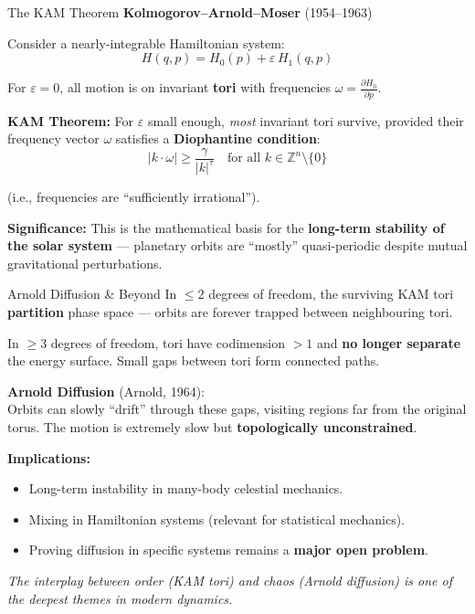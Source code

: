\begin{frame}{The KAM Theorem}
\textbf{Kolmogorov--Arnold--Moser} (1954--1963)

\vspace{0.2cm}
Consider a nearly-integrable Hamiltonian system:
\[
H(q,p) = H_0(p) + \varepsilon\, H_1(q,p)
\]

For $\varepsilon = 0$, all motion is on invariant \textbf{tori} with frequencies $\omega = \frac{\partial H_0}{\partial p}$.

\vspace{0.3cm}
\textbf{KAM Theorem:} For $\varepsilon$ small enough, \emph{most} invariant tori survive, provided their frequency vector $\omega$ satisfies a \textbf{Diophantine condition}:
\[
|k \cdot \omega| \geq \frac{\gamma}{|k|^\tau} \quad \text{for all } k \in \mathbb{Z}^n \setminus \{0\}
\]

(i.e., frequencies are ``sufficiently irrational'').

\vspace{0.3cm}
\textbf{Significance:} This is the mathematical basis for the \textbf{long-term stability of the solar system} --- planetary orbits are ``mostly'' quasi-periodic despite mutual gravitational perturbations.
\end{frame}


\begin{frame}{Arnold Diffusion \& Beyond}
In $\leq 2$ degrees of freedom, the surviving KAM tori \textbf{partition} phase space --- orbits are forever trapped between neighbouring tori.

\vspace{0.3cm}
In $\geq 3$ degrees of freedom, tori have codimension $> 1$ and \textbf{no longer separate} the energy surface. Small gaps between tori form connected paths.

\vspace{0.3cm}
\textbf{Arnold Diffusion} (Arnold, 1964): \\
Orbits can slowly ``drift'' through these gaps, visiting regions far from the original torus. The motion is extremely slow but \textbf{topologically unconstrained}.

\vspace{0.3cm}
\textbf{Implications:}
\begin{itemize}
    \item Long-term instability in many-body celestial mechanics.
    \item Mixing in Hamiltonian systems (relevant for statistical mechanics).
    \item Proving diffusion in specific systems remains a \textbf{major open problem}.
\end{itemize}

\vspace{0.2cm}
\textit{The interplay between order (KAM tori) and chaos (Arnold diffusion) is one of the deepest themes in modern dynamics.}
\end{frame}
